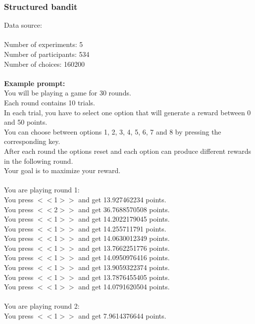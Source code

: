 \documentclass[pdflatex,sn-nature]{sn-jnl}%
\theoremstyle{thmstyleone}%
\theoremstyle{thmstyletwo}%
\theoremstyle{thmstylethree}%
\begin{document}
\subsubsection*{Structured bandit}
Data source: \cite{schulz2020finding} \\ $~$ \\
Number of experiments: 5 $~$\\ 
Number of participants: 534 $~$\\ 
Number of choices: 160200 $~$\\ 
 $~$\\ 
\textbf{Example prompt:}
 $~$\\ 
You will be playing a game for 30 rounds. $~$\\ 
Each round contains 10 trials. $~$\\ 
In each trial, you have to select one option that will generate a reward between 0 and 50 points. $~$\\ 
You can choose between options 1, 2, 3, 4, 5, 6, 7 and 8 by pressing the corresponding key. $~$\\ 
After each round the options reset and each option can produce different rewards in the following round. $~$\\ 
Your goal is to maximize your reward. $~$\\ 
 $~$\\ 
You are playing round 1: $~$\\ 
You press $<<$1$>>$ and get 13.927462234 points. $~$\\ 
You press $<<$2$>>$ and get 36.7688570508 points. $~$\\ 
You press $<<$1$>>$ and get 14.2022179045 points. $~$\\ 
You press $<<$1$>>$ and get 14.255711791 points. $~$\\ 
You press $<<$1$>>$ and get 14.0630012349 points. $~$\\ 
You press $<<$1$>>$ and get 13.7662251776 points. $~$\\ 
You press $<<$1$>>$ and get 14.0950976416 points. $~$\\ 
You press $<<$1$>>$ and get 13.9059322374 points. $~$\\ 
You press $<<$1$>>$ and get 13.7876455405 points. $~$\\ 
You press $<<$1$>>$ and get 14.0791620504 points. $~$\\ 
 $~$\\ 
You are playing round 2: $~$\\ 
You press $<<$1$>>$ and get 7.9614376644 points. $~$\\ 
\end{document}
